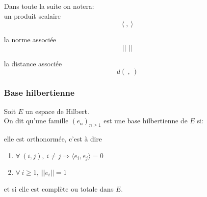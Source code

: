 \documentclass[xcolor=dvipsnames,10pt,mathserif]{beamer}
\theoremstyle{plain}
\newcommand{\la}{\langle}
\newcommand{\ra}{\rangle}
\begin{document}
\begin{frame}{\hfill \insertpagenumber}

\begin{block}{}
Dans toute la suite on notera:
\\un produit scalaire  
\begin{equation}
 \la\ ,\ \ra 
\end{equation} 

la norme associée 
\begin{equation} 
||\ ||
\end{equation} 

la distance associée 
\begin{equation}
d(\ ,\ )
\end{equation}
\end{block}

\end{frame}

\begin{frame} \frametitle{Base hilbertienne \hfill \insertpagenumber}
Soit $E$ un espace de Hilbert.
\\On dit qu'une famille $(e_n)_{n\geqslant 1}$ est une base hilbertienne de $E$ si:

\begin{block}{}
elle est orthonormée, c'est à dire
\begin{enumerate}
\item $\forall \ (i,j),\  i \neq j \Rightarrow \la e_i ,e_j \ra = 0$
\item $\forall \ i \geqslant 1,\  || e_i ||=1$
\end{enumerate}
\end{block}

\begin{block}{}
et si elle est complète ou totale dans $E$.
\end{block}

\end{frame}
 
\end{document}
